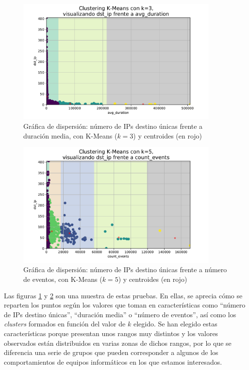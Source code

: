 \begin{figure}[h]
    \centering
    \captionsetup{width=0.75\textwidth}
    \includegraphics[width=0.9\textwidth]{../figures/dispersion-k3-dst_ip-vs-avg_duration.pdf}
    \caption{Gráfica de dispersión: número de IPs destino únicas frente a duración media, con K-Means ($k=3$) y centroides (en rojo)}
    \label{fig:scatterdstipavgduration}
\end{figure}

\begin{figure}[h]
    \centering
    \captionsetup{width=0.75\textwidth}
    \includegraphics[width=0.9\textwidth]{../figures/dispersion-k5-dst_ip-vs-count_events.pdf}
    \caption{Gráfica de dispersión: número de IPs destino únicas frente a número de eventos, con K-Means ($k=5$) y centroides (en rojo)}
    \label{fig:scatterdstipcountevents}
\end{figure}

Las figuras \ref{fig:scatterdstipavgduration} y \ref{fig:scatterdstipcountevents} son una muestra de estas pruebas.
En ellas, se aprecia cómo se reparten los puntos según los valores que toman en características como ``número de IPs destino únicas'', ``duración media'' o ``número de eventos'',
así como los \emph{clusters} formados en función del valor de $k$ elegido.
Se han elegido estas características porque presentan unos rangos muy distintos y los valores observados están distribuidos en varias zonas de dichos rangos,
por lo que se diferencia una serie de grupos que pueden corresponder a algunos de los comportamientos de equipos informáticos en los que estamos interesados.

